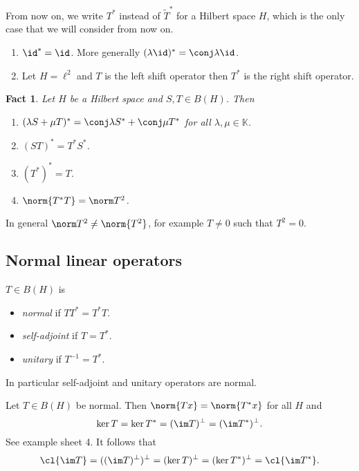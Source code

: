 \documentclass[a4paper]{article}
\newtheorem*{fact}{Fact}
\newcommand{\K}{{\mathbb{K}}} %
\begin{document}
From now on, we write \(T^*\) instead of \(\tilde T^*\) for a Hilbert space \(H\), which is the only case that we will consider from now on.

\begin{eg}\leavevmode
  \begin{enumerate}
  \item \(\id^* = \id\). More generally \((\lambda \id)^* = \conj \lambda \id\).
  \item Let \(H = \ell^2\) and \(T\) is the left shift operator then \(T^*\) is the right shift operator.
  \end{enumerate}
\end{eg}

\begin{fact}
  Let \(H\) be a Hilbert space and \(S, T \in B(H)\). Then
  \begin{enumerate}
  \item \((\lambda S + \mu T)^* = \conj \lambda S^* + \conj \mu T^*\) for all \(\lambda, \mu \in \K\).
  \item \((ST)^* = T^*S^*\).
  \item \((T^*)^* = T\).
  \item \(\norm{T^* T} = \norm T^2\).
  \end{enumerate}
\end{fact}

\begin{note}
  In general \(\norm T^2 \neq \norm{T^2}\), for example \(T \neq 0\) such that \(T^2 = 0\).
\end{note}

\subsection{Normal linear operators}

\begin{definition}
  \(T \in B(H)\) is
  \begin{itemize}
  \item \emph{normal} if \(TT^* = T^*T\).
  \item \emph{self-adjoint} if \(T = T^*\).
  \item \emph{unitary} if \(T^{-1} = T^*\).
  \end{itemize}
\end{definition}

In particular self-adjoint and unitary operators are normal.

\begin{ex}
  Let \(T \in B(H)\) be normal. Then \(\norm{Tx} = \norm{T^*x}\) for all \(H\) and
  \[
    \ker T = \ker T^* = (\im T)^\perp = (\im T^*)^\perp.
  \]
  See example sheet 4. It follows that
  \[
    \cl{\im T} = ((\im T)^\perp)^\perp = (\ker T)^\perp = (\ker T^*)^\perp = \cl{\im T^*}.
  \]
\end{ex}
\end{document}
